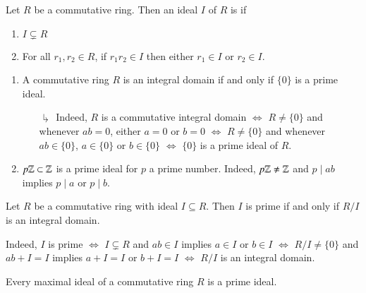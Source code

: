 \documentclass[12pt, a4paper, twoside, openright, titlepage]{book}
\begin{document}
\begin{defn}{}{}
    Let $R$ be a commutative ring. Then an ideal $I$ of $R$ is  if \begin{enumerate}
        \item $I \subsetneq R$
        \item For all $r_1,r_2 \in R$, if $r_1r_2 \in I$ then either $r_1 \in I$ or $r_2 \in I$.
    \end{enumerate}
\end{defn}

\begin{eg}{}{}
    \begin{enumerate}
        \item A commutative ring $R$ is an integral domain if and only if $\{0\}$ is a prime ideal.
        \begin{enumerate}
            \item[$\drsh$] Indeed, $R$ is a commutative integral domain $\iff$ $R \neq \{0\}$ and whenever $ab = 0$, either $a = 0$ or $b = 0$ $\iff$ $R \neq \{0\}$ and whenever $ab \in \{0\}$, $a \in \{0\}$ or $b \in \{0\}$ $\iff$ $\{0\}$ is a prime ideal of $R$. 
        \end{enumerate}
        \item $p\mathbb Z \subset \mathbb Z$ is a prime ideal for $p$ a prime number. Indeed, $p\mathbb Z \neq \mathbb Z$ and $p \;\vert\;ab$ implies $p \;\vert \;a$ or $p\;\vert\;b$.
    \end{enumerate}
\end{eg}

\begin{prop}{}{}
    Let $R$ be a commutative ring with ideal $I \subseteq R$. Then $I$ is prime if and only if $R/I$ is an integral domain.
    \begin{proof*}{}{}
        Indeed, $I$ is prime $\iff$ $I \subsetneq R$ and $ab \in I$ implies $a \in I$ or $b \in I$ $\iff$ $R/I \neq \{0\}$ and $ab+I = I$ implies $a + I = I$ or $b + I = I$ $\iff$ $R/I$ is an integral domain.
    \end{proof*}
\end{prop}

\begin{cor}{}{}
    Every maximal ideal of a commutative ring $R$ is a prime ideal.
\end{cor}
\end{document}
